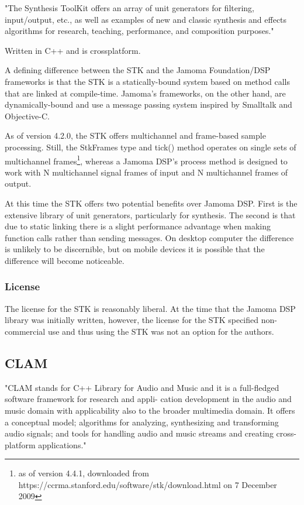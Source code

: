 \documentclass[twoside,10pt]{article}
\begin{document}
"The Synthesis ToolKit offers an array of unit generators for filtering, input/output, etc., as well as examples of new and classic synthesis and effects algorithms for research, teaching, performance, and composition purposes."\cite{Cook:1999}

Written in C++ and is crossplatform.


A defining difference between the STK and the Jamoma Foundation/DSP frameworks is that the STK is a statically-bound system based on method calls that are linked at compile-time.  Jamoma's frameworks, on the other hand, are dynamically-bound and use a message passing system inspired by Smalltalk\cite{Krasner:1988} and Objective-C\cite{Cox:1986}.

As of version 4.2.0, the STK offers multichannel and frame-based sample processing\cite{Scavone:2005}. Still, the StkFrames type and tick() method operates on single sets of multichannel frames\footnote{as of version 4.4.1, downloaded from https://ccrma.stanford.edu/software/stk/download.html on 7 December 2009}, whereas a Jamoma DSP's process method is designed to work with N multichannel signal frames of input and N multichannel frames of output.

At this time the STK offers two potential benefits over Jamoma DSP.  First is the extensive library of unit generators, particularly for synthesis.  The second is that due to static linking there is a slight performance advantage when making function calls rather than sending messages.  On desktop computer the difference is unlikely to be discernible, but on mobile devices it is possible that the difference will become noticeable.

\subsubsection{License}
The license for the STK is reasonably liberal.  At the time that the Jamoma DSP library was initially written, however, the license for the STK specified non-commercial use and thus using the STK was not an option for the authors.  




\subsection{CLAM} %

"CLAM stands for C++ Library for Audio and Music and it is a full-fledged software framework for research and appli- cation development in the audio and music domain with applicability also to the broader multimedia domain.   It offers a conceptual model; algorithms for analyzing, synthesizing and transforming audio signals; and tools for handling audio and music streams and creating cross-platform applications."
\end{document}
